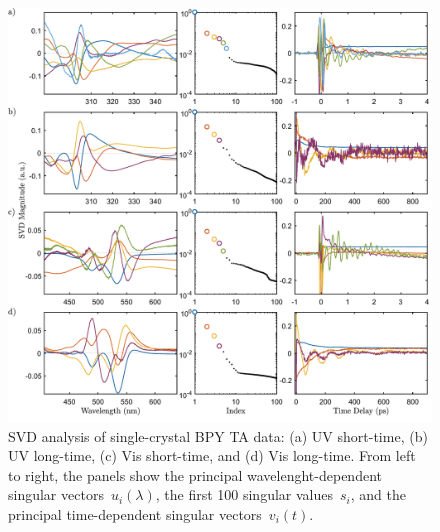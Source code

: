 \begin{figure}[p]
  \centering
  \includegraphics[width = \textwidth]{Figures/fig_BPY_data_crystal_svd.pdf}
  \caption[SVD analysis of single-crystal BPY TA data.]{
    SVD analysis of single-crystal BPY TA data:
    (a) UV short-time, (b) UV long-time, (c) Vis short-time, and (d) Vis long-time.
    From left to right, the panels show
    the principal wavelenght-dependent singular vectors~$u_i(\lambda)$,
    the first 100 singular values~$s_i$,
    and the principal time-dependent singular vectors~$v_i(t)$.
  }
  \label{fig: BPY-data-crystal-svd}
\end{figure}
